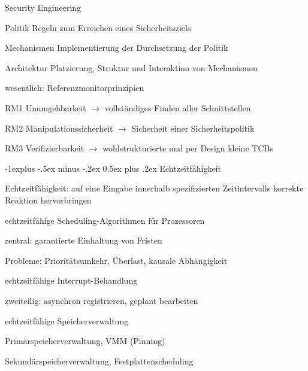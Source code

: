 \documentclass[a4paper]{article}
\makeatletter
\renewcommand{\subsection}{\@startsection{subsection}{2}{0mm}%
 {-1explus -.5ex minus -.2ex}%
 {0.5ex plus .2ex}%
 {\normalfont\normalsize\bfseries}}
\makeatother
\begin{document}
\begin{multicols}{3}
    Security Engineering
    \begin{description*}
        \item[Politik] Regeln zum Erreichen eines Sicherheitsziels %
        \item[Mechanismen] Implementierung der Durchsetzung der Politik %
        \item[Architektur] Platzierung, Struktur und Interaktion von Mechanismen
    \end{description*}
    wesentlich: Referenzmonitorprinzipien
    \begin{description*}
        \item[RM1] Unumgehbarkeit $\rightarrow$ vollständiges Finden aller Schnittstellen
        \item[RM2] Manipulationssicherheit $\rightarrow$ Sicherheit einer Sicherheitspolitik %
        \item[RM3] Verifizierbarkeit $\rightarrow$ wohlstrukturierte und per Design kleine TCBs
    \end{description*}

    \subsection{Echtzeitfähigkeit}
    \begin{itemize*}
        \item Echtzeitfähigkeit: auf eine Eingabe innerhalb spezifizierten Zeitintervalls korrekte Reaktion hervorbringen
    \end{itemize*}
    \begin{enumerate*}
        \item echtzeitfähige Scheduling-Algorithmen für Prozessoren
        \item zentral: garantierte Einhaltung von Fristen
        \item Probleme: Prioritätsumkehr, Überlast, kausale Abhängigkeit
        \item echtzeitfähige Interrupt-Behandlung
        \item zweiteilig: asynchron registrieren, geplant bearbeiten
        \item echtzeitfähige Speicherverwaltung
        \item Primärspeicherverwaltung, VMM (Pinning)
        \item Sekundärspeicherverwaltung, Festplattenscheduling
    \end{enumerate*}


\end{multicols}
\end{document}
